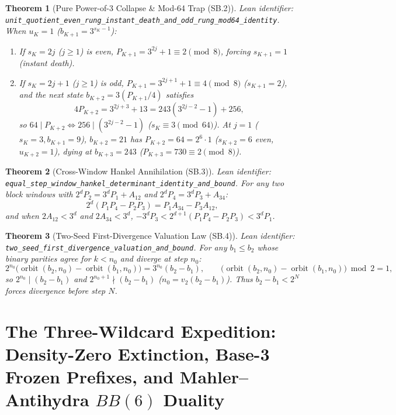 \documentclass[11pt]{article}
\newtheorem{theorem}{Theorem}[section]
\begin{document}
\begin{theorem}[Pure Power-of-3 Collapse \& Mod-64 Trap (SB.2)]
\emph{Lean identifier:} \nolinkurl{unit_quotient_even_rung_instant_death_and_odd_rung_mod64_identity}.
When $u_K = 1$ ($b_{K+1} = 3^{s_K - 1}$):
\begin{enumerate}
  \item If $s_K = 2j$ ($j \ge 1$) is even, $P_{K+1} = 3^{2j} + 1 \equiv 2 \pmod 8$, forcing $s_{K+1} = 1$ (instant death).
  \item If $s_K = 2j + 1$ ($j \ge 1$) is odd, $P_{K+1} = 3^{2j+1} + 1 \equiv 4 \pmod 8$ ($s_{K+1} = 2$), and the next state $b_{K+2} = 3(P_{K+1}/4)$ satisfies
  \[
    4 P_{K+2} = 3^{2j+3} + 13 = 243(3^{2j-2} - 1) + 256,
  \]
  so $64 \mid P_{K+2} \iff 256 \mid (3^{2j-2} - 1)$ ($s_K \equiv 3 \pmod{64}$). At $j = 1$ ($s_K = 3, b_{K+1} = 9$), $b_{K+2} = 21$ has $P_{K+2} = 64 = 2^6 \cdot 1$ ($s_{K+2} = 6$ even, $u_{K+2} = 1$), dying at $b_{K+3} = 243$ ($P_{K+3} = 730 \equiv 2 \pmod 8$).
\end{enumerate}
\end{theorem}

\begin{theorem}[Cross-Window Hankel Annihilation (SB.3)]
\emph{Lean identifier:} \nolinkurl{equal_step_window_hankel_determinant_identity_and_bound}.
For any two block windows with $2^d P_2 = 3^d P_1 + A_{12}$ and $2^d P_4 = 3^d P_3 + A_{34}$:
\[
  2^d(P_1 P_4 - P_2 P_3) = P_1 A_{34} - P_3 A_{12},
\]
and when $2 A_{12} < 3^d$ and $2 A_{34} < 3^d$, $-3^d P_3 < 2^{d+1}(P_1 P_4 - P_2 P_3) < 3^d P_1$.
\end{theorem}

\begin{theorem}[Two-Seed First-Divergence Valuation Law (SB.4)]
\emph{Lean identifier:} \nolinkurl{two_seed_first_divergence_valuation_and_bound}.
For any $b_1 \le b_2$ whose binary parities agree for $k < n_0$ and diverge at step $n_0$:
\[
  2^{n_0}\big(\operatorname{orbit}(b_2, n_0) - \operatorname{orbit}(b_1, n_0)\big) = 3^{n_0}(b_2 - b_1),\qquad \big(\operatorname{orbit}(b_2, n_0) - \operatorname{orbit}(b_1, n_0)\big) \bmod 2 = 1,
\]
so $2^{n_0} \mid (b_2 - b_1)$ and $2^{n_0+1} \nmid (b_2 - b_1)$ ($n_0 = v_2(b_2 - b_1)$). Thus $b_2 - b_1 < 2^N$ forces divergence before step $N$.
\end{theorem}

\section{The Three-Wildcard Expedition: Density-Zero Extinction, Base-3 Frozen Prefixes, and Mahler--Antihydra $BB(6)$ Duality}
\end{document}

